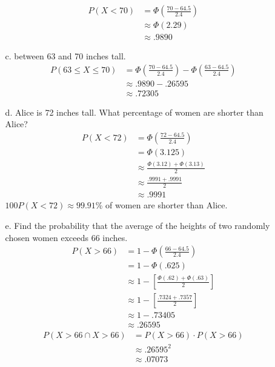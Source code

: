 \documentclass[letterpaper,12pt]{article}
\begin{document}
\begin{enumerate}
\begin{enumerate}
\begin{align*}
          P(X < 70) &= \Phi\left(\frac{70 - 64.5}{2.4}\right) \\
          &\approx \Phi(2.29) \\
          &\approx .9890
        \end{align*}
      \item[c.]
        between 63 and 70 inches tall.
        \begin{align*}
          P(63 \le X \le 70) &= \Phi\left(\frac{70 - 64.5}{2.4}\right) - \Phi\left(\frac{63 - 64.5}{2.4}\right) \\
          &\approx .9890 - .26595 \\
          &\approx .72305
        \end{align*}
      \item[d.]
        Alice is 72 inches tall. What percentage of women are shorter than Alice?
        \begin{align*}
          P(X < 72) &= \Phi\left(\frac{72 - 64.5}{2.4}\right) \\
          &= \Phi(3.125) \\
          &\approx \frac{\Phi(3.12) + \Phi(3.13)}{2} \\
          &\approx \frac{.9991 + .9991}{2} \\
          &\approx .9991
        \end{align*}
        $100P(X < 72) \approx 99.91$\% of women are shorter than Alice.
      \item[e.]
        Find the probability that the average of the heights of two randomly chosen women exceeds 66 inches.
        \begin{align*}
          P(X > 66) &= 1 - \Phi\left(\frac{66 - 64.5}{2.4}\right) \\
          &= 1 - \Phi(.625) \\
          &\approx 1 - \left[\frac{\Phi(.62) + \Phi(.63)}{2}\right] \\
          &\approx 1 - \left[\frac{.7324 + .7357}{2}\right] \\
          &\approx 1 - .73405 \\
          &\approx .26595
        \end{align*}
        \begin{align*}
          P(X > 66 \cap X > 66) &= P(X > 66) \cdot P(X > 66) \\
          &\approx .26595^2 \\
          &\approx .07073
        \end{align*}
    \end{enumerate}
\end{enumerate}
\end{document}
